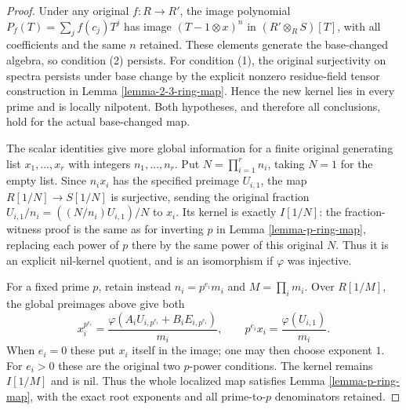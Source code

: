 \begin{proof}
Under any original $f:R\to R'$,
the image polynomial
$P_f(T)=\sum_j f(c_j)T^j$ has
image $(T-1\otimes x)^n$ in
$(R'\otimes_R S)[T]$, with all
coefficients and the same $n$
retained. These elements generate
the base-changed algebra, so
condition (2) persists. For
condition (1), the original
surjectivity on spectra persists
under base change by the explicit
nonzero residue-field tensor
construction in Lemma
\ref{lemma-2-3-ring-map}. Hence
the new kernel lies in every
prime and is locally nilpotent.
Both hypotheses, and therefore
all conclusions, hold for the
actual base-changed map.

The scalar identities give more
global information for a finite
original generating list
$x_1,\ldots,x_r$ with integers
$n_1,\ldots,n_r$. Put
$N=\prod_{i=1}^r n_i$, taking
$N=1$ for the empty list.
Since $n_i x_i$ has the
specified preimage $U_{i,1}$,
the map $R[1/N]\to S[1/N]$
is surjective, sending the
original fraction
$U_{i,1}/n_i=((N/n_i)U_{i,1})/N$
to $x_i$. Its kernel is exactly
$I[1/N]$: the fraction-witness
proof is the same as for
inverting $p$ in Lemma
\ref{lemma-p-ring-map}, replacing
each power of $p$ there by the
same power of this original $N$.
Thus it is an explicit nil-kernel
quotient, and is an isomorphism
if $\varphi$ was injective.

For a fixed prime $p$, retain
instead $n_i=p^{e_i}m_i$ and
$M=\prod_i m_i$. Over $R[1/M]$,
the global preimages above give
both
$$
x_i^{p^{e_i}}=
\frac{\varphi(A_iU_{i,p^{e_i}}+B_iE_{i,p^{e_i}})}{m_i},
\qquad
p^{e_i}x_i=\frac{\varphi(U_{i,1})}{m_i}.
$$
When $e_i=0$ these put $x_i$
itself in the image; one may
then choose exponent $1$.
For $e_i>0$ these are the
original two $p$-power conditions.
The kernel remains $I[1/M]$
and is nil. Thus the whole
localized map satisfies Lemma
\ref{lemma-p-ring-map}, with the
exact root exponents and all
prime-to-$p$ denominators retained.
\end{proof}